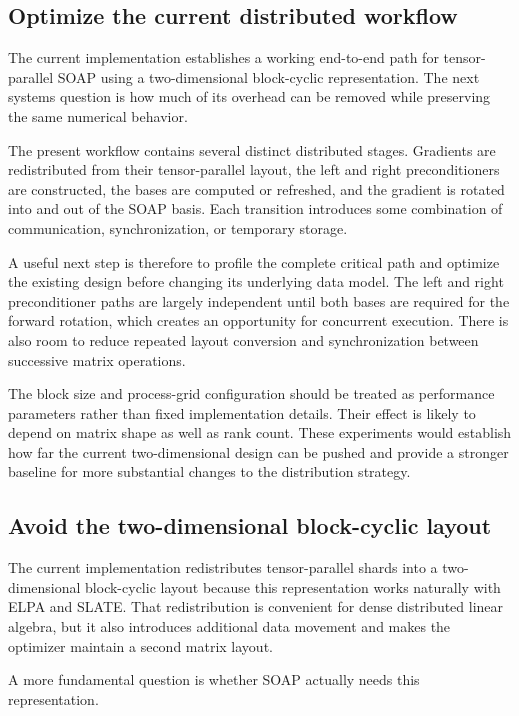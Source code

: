 \documentclass[11pt]{article}
\begin{document}
\subsection{Optimize the current distributed workflow}

The current implementation establishes a working end-to-end path for tensor-parallel SOAP using a two-dimensional block-cyclic representation. The next systems question is how much of its overhead can be removed while preserving the same numerical behavior.

The present workflow contains several distinct distributed stages. Gradients are redistributed from their tensor-parallel layout, the left and right preconditioners are constructed, the bases are computed or refreshed, and the gradient is rotated into and out of the SOAP basis. Each transition introduces some combination of communication, synchronization, or temporary storage.

A useful next step is therefore to profile the complete critical path and optimize the existing design before changing its underlying data model. The left and right preconditioner paths are largely independent until both bases are required for the forward rotation, which creates an opportunity for concurrent execution. There is also room to reduce repeated layout conversion and synchronization between successive matrix operations.

The block size and process-grid configuration should be treated as performance parameters rather than fixed implementation details. Their effect is likely to depend on matrix shape as well as rank count. These experiments would establish how far the current two-dimensional design can be pushed and provide a stronger baseline for more substantial changes to the distribution strategy.

\subsection{Avoid the two-dimensional block-cyclic layout}

The current implementation redistributes tensor-parallel shards into a two-dimensional block-cyclic layout because this representation works naturally with ELPA and SLATE. That redistribution is convenient for dense distributed linear algebra, but it also introduces additional data movement and makes the optimizer maintain a second matrix layout.

A more fundamental question is whether SOAP actually needs this representation.
\end{document}
